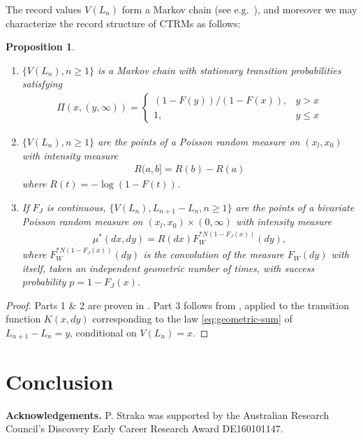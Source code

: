 \documentclass[12pt]{article}
\newtheorem{proposition}[equation]{Proposition}
\newcommand{\1}{\mathbf 1}
\begin{document}
The record values $V(L_n)$ form a Markov chain (see e.g.\ \cite{resnick2013extreme}), and moreover we may characterize the record structure of CTRMs as follows: 

\begin{proposition}
\begin{enumerate}
\item
$\{V(L_n), n \ge 1\}$ is a Markov chain with stationary transition probabilities satisfying
\begin{align*}
\Pi(x, (y,\infty)) = 
\begin{cases}
(1-F(y)) / (1-F(x)), & y > x
\\
1, & y \le x
\end{cases}
\end{align*}
\item
$\{V(L_n), n \ge 1\}$ are the points of a Poisson random measure on $(x_l, x_0)$ with intensity measure
\begin{align*}
R(a,b] = R(b) - R(a)
\end{align*}
where $R(t) = -\log(1-F(t))$. 
\item
If $F_J$ is continuous, $\{V(L_n), L_{n+1} - L_n, n \ge 1\}$ are the points of a bivariate Poisson random measure on
$(x_l, x_0) \times (0,\infty)$ with intensity measure
\begin{align*}
\mu^*(dx, dy) = R(dx) F_W^{*N(1-F_J(x))}(dy),
\end{align*}
where $F_W^{*N(1-F_J(x))}(dy)$ is the convolution of the measure $F_W(dy)$ with itself, taken an independent geometric number of times, with success probability $p = 1-F_J(x)$.
\end{enumerate}
\end{proposition}

\begin{proof}
Parts 1 \& 2 are proven in 
\cite[Proposition 4.1 (i) \& (iii)]{resnick2013extreme}.
Part 3 follows from \cite[Proposition 3.8]{resnick2013extreme}, 
applied to the transition function $K(x,dy)$ corresponding to the law \eqref{eq:geometric-sum} of $L_{n+1} - L_n = y$, conditional on $V(L_n) = x$. 
\end{proof}









\section{Conclusion}


{\bf Acknowledgements.} P. Straka was supported by the Australian Research Council’s Discovery Early Career Research Award DE160101147.




\end{document}
